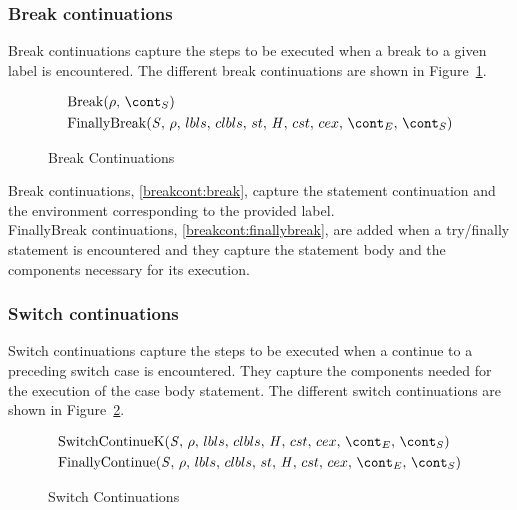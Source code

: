 \documentclass{article}
\begin{document}
\subsubsection{Break continuations}
\label{subsubsec:break-continuations}

Break continuations capture the steps to be executed when a break to a given label is encountered.
The different break continuations are shown in Figure~\ref{figure:breakcont}.
\newcommand{\Break}[2]{\mathrm{Break}(#1,\,#2)}
\newcommand{\FinallyBreak}[2]{\mathrm{FinallyBreak}({#1},\,\env,\,\lbls,\,\clbls,\,\strace,\,\handler,\,\cstrace,\,\cex,\,\econt,\,{#2})}

\begin{figure}[Htp]
  \begin{align}
    &\Break{\env}{\scont} \label{breakcont:break} \\
    &\FinallyBreak{\stmt}{\scont} \label{breakcont:finallybreak}
  \end{align}
  \caption{Break Continuations}
  \label{figure:breakcont}
\end{figure}

Break continuations, \ref{breakcont:break}, capture the statement continuation and the environment corresponding to the provided label.\\
FinallyBreak continuations, \ref{breakcont:finallybreak}, are added when a try/finally statement is encountered and they capture the statement body and the components necessary for its execution.
\subsubsection{Switch continuations}
\label{subsubsec:switch-continuations}

Switch continuations capture the steps to be executed when a continue to a preceding switch case is encountered.
They capture the components needed for the execution of the case body statement.
The different switch continuations are shown in Figure~\ref{figure:switchconts}.
%
\newcommand{\ContinueK}{\mathrm{SwitchContinueK}(\stmt,\,\env,\,\lbls,\,\clbls,\,\handler,\,\cstrace,\,\cex,\,\econt,\,\scont)}
\newcommand{\FinallyContinue}[2]{\mathrm{FinallyContinue}({#1},\,\env,\,\lbls,\,\clbls,\,\strace,\,\handler,\,\cstrace,\,\cex,\,\econt,\,{#2})}

\begin{figure}[Htp]
  \begin{align}
    &\ContinueK \label{switchcont:continue} \\
    &\FinallyContinue{\stmt}{\scont} \label{switchcont:finallycontinue}
  \end{align}
  \caption{Switch Continuations}
  \label{figure:switchconts}
\end{figure}
\end{document}
